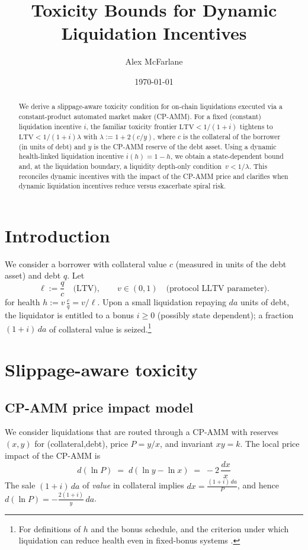 \documentclass[11pt]{article}
\title{Toxicity Bounds for Dynamic Liquidation Incentives}
\author{Alex McFarlane}
\date{\today}
\begin{document}
\maketitle

\begin{abstract}
We derive a slippage-aware toxicity condition for on-chain liquidations executed via a constant-product automated market maker (CP-AMM). For a fixed (constant) liquidation incentive \(i\), the familiar toxicity frontier \( \mathrm{LTV} < 1/(1+i) \) tightens to
\(\mathrm{LTV} < 1/(1+i)\lambda\) with \(\lambda := 1 + 2(c/y)\), where \(c\) is the collateral of the borrower (in units of debt) and \(y\) is the CP-AMM reserve of the debt asset. Using a dynamic health-linked liquidation incentive \(i(h) = 1 - h\), we obtain a state-dependent bound and, at the liquidation boundary, a liquidity depth-only condition \( \,v < 1/\lambda\). This reconciles dynamic incentives with the impact of the CP-AMM price and clarifies when dynamic liquidation incentives reduce versus exacerbate spiral risk.
\end{abstract}

\section{Introduction}
We consider a borrower with collateral value \(c\) (measured in units of the debt asset) and debt \(q\). Let
\[
\ell := \frac{q}{c} \quad \text{(LTV)}, 
\qquad v \in (0,1) \quad \text{(protocol LLTV parameter)}.
\]
for health \( h := v\,\frac{c}{q} = v/\ell \). Upon a small liquidation repaying \(da\) units of debt, the liquidator is entitled to a bonus \(i \ge 0\) (possibly state dependent); a fraction \((1+i)\,da\) of collateral value is seized.\footnote{For definitions of \(h\) and the bonus schedule, and the criterion under which liquidation can reduce health even in fixed-bonus systems \cite{Bentley}.}

\section{Slippage-aware toxicity}

\subsection{CP-AMM price impact model}
We consider liquidations that are routed through a CP-AMM with reserves \((x,y)\) for (collateral,debt), price \(P=y/x\), and invariant \(xy=k\). The local price impact of the CP-AMM is
\begin{equation}
d(\ln P) \;=\; d(\ln y - \ln x) \;=\; -2\,\frac{dx}{x}
\label{eq:cp-impact}
\end{equation}
The sale \((1+i)\,da\) of \emph{value} in collateral implies \(dx = \frac{(1+i)\,da}{P}\), and hence \(d(\ln P) = -\frac{2(1+i)}{y}\,da\).
\end{document}
